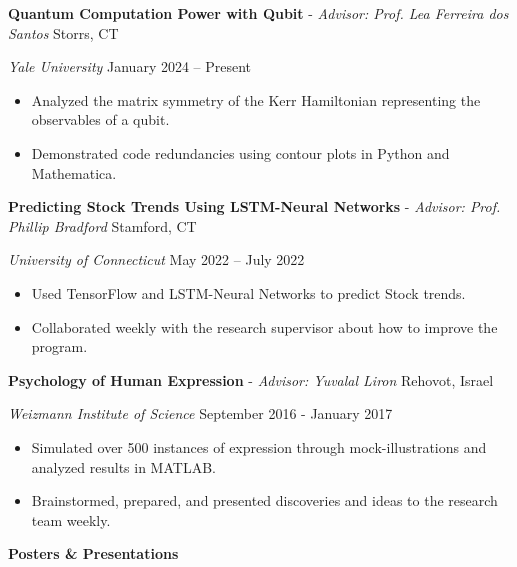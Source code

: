 \documentclass[11pt]{article}
\begin{document}
\vspace{8pt}

\textbf{Quantum Computation Power with Qubit} - \textit{Advisor: Prof. Lea Ferreira dos Santos} \hfill Storrs, CT

\textit{Yale University} \hfill January 2024 – Present
\begin{itemize}[noitemsep, topsep=0pt, partopsep=0pt, parsep=0pt]
    \item Analyzed the matrix symmetry of the Kerr Hamiltonian representing the observables of a qubit.
    \item Demonstrated code redundancies using contour plots in Python and Mathematica.
\end{itemize}

\vspace{8pt}

\textbf{Predicting Stock Trends Using LSTM-Neural Networks} - \textit{Advisor: Prof. Phillip Bradford} \hfill Stamford, CT

\textit{University of Connecticut} \hfill May 2022 – July 2022
\begin{itemize}[noitemsep, topsep=0pt, partopsep=0pt, parsep=0pt]
    \item Used TensorFlow and LSTM-Neural Networks to predict Stock trends.
    \item Collaborated weekly with the research supervisor about how to improve the program.
\end{itemize}

\vspace{8pt}

\textbf{Psychology of Human Expression} - \textit{Advisor: Yuvalal Liron} \hfill Rehovot, Israel

\textit{Weizmann Institute of Science} \hfill September 2016 - January 2017
\begin{itemize}[noitemsep, topsep=0pt, partopsep=0pt, parsep=0pt]
    \item Simulated over 500 instances of expression through mock-illustrations and analyzed results in MATLAB.
    \item Brainstormed, prepared, and presented discoveries and ideas to the research team weekly.
\end{itemize}

\vspace{12pt}

\begin{center}
    \textbf{Posters \& Presentations}
\end{center}
\end{document}
